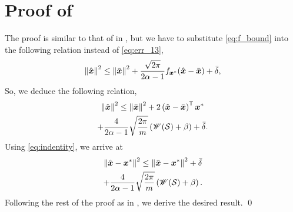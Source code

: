 \documentclass[journal]{IEEEtran}
\newcommand{\wid}{\mathscr{W}}
\begin{document}
\section{Proof of }\label{app:noisy_moremes}
The proof is similar to that of  in , but we have to substitute \eqref{eq:f_bound} into the following relation instead of \eqref{eq:err_13},
\begin{equation}
\left\Vert\hat{\boldsymbol{x}}\right\Vert^2\leq \left\Vert\bar{\boldsymbol{x}}\right\Vert^2+ \frac{\sqrt{2\pi}}{2\alpha-1}f_{\boldsymbol{x}^*}(\hat{\boldsymbol{x}}-\bar{\boldsymbol{x}})+\bar{\delta},
\end{equation}
So, we deduce the following relation,
\begin{multline}
\lV\hat{\vecx}\rV^2\leq \lV\bar{\vecx}\rV^2+2\lb\hat{\vecx}-\bar{\vecx}\rb\tran\vecx^*\\+\frac{4}{2\alpha-1}\sqrt{\frac{2\pi}{m}}\lb\wid(\calS)+\beta\rb+\bar{\delta}.
\end{multline}
Using \eqref{eq:indentity}, we arrive at
\begin{multline}
\lV\hat{\vecx}-\vecx^*\rV^2\leq \lV\bar{\vecx}-\vecx^*\rV^2+\bar{\delta}\\+\frac{4}{2\alpha-1}\sqrt{\frac{2\pi}{m}}\lb\wid(\calS)+\beta\rb.
\end{multline}
Following the rest of the proof as in , we derive the desired result.
\hfill\qed


\par\leavevmode
\end{document}
